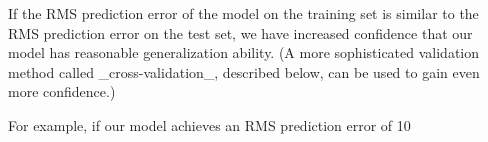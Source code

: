 If the RMS prediction error of the model on the training set is similar to the RMS prediction error on the test set, we have increased confidence that our model has reasonable generalization ability. (A more sophisticated validation method called _cross-validation_, described below, can be used to gain even more confidence.)

For example, if our model achieves an RMS prediction error of 10%

 